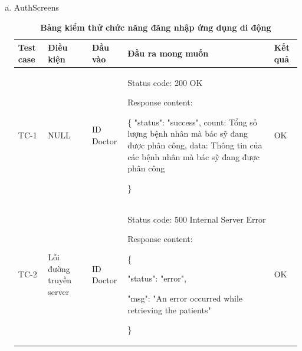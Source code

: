 \begin{enumerate}[a)]
  \item AuthScreens
  \begin{xltabular}{\textwidth}{
    | >{\raggedright\arraybackslash}m{1cm}
    | >{\raggedright\arraybackslash}X
    | >{\raggedright\arraybackslash}X
    | >{\raggedright\arraybackslash}X
    | >{\raggedright\arraybackslash}m{1cm}|
    }
    \caption{\bfseries \fontsize{12pt}{0pt}\selectfont Bảng kiểm thử chức năng đăng nhập ứng dụng di động}
    \\
    \hline
    \bfseries Test case    &\bfseries Điều kiện   &\bfseries Đầu vào 
    &\bfseries Đầu ra mong muốn &\bfseries Kết quả\\ \hline
  
  
    TC-1 & NULL & ID Doctor & 
      Status code: 200 OK
    
        Response content:
    
        \{
      "status": "success",
      count: Tổng số lượng bệnh nhân mà bác sỹ đang được phân công,
      data: Thông tin của các bệnh nhân mà bác sỹ đang được phân công
    
      \}
    & OK
  
    \\ \hline
  
    TC-2
    & Lỗi đường truyền server
    & ID Doctor

   &
  
    Status code: 500 Internal Server Error
  
      Response content:
  
      \{
  
    "status": "error",
  
    "msg": "An error occurred while retrieving the patients"
  
    \}
    
    & OK
  
    \\ \hline

  
    \end{xltabular}
\end{enumerate}


\newpage
